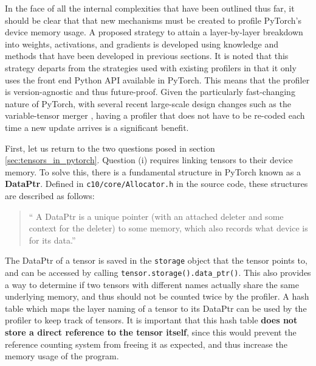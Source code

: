 \documentclass[12pt,letterpaper]{article}
\begin{document}
In the face of all the internal complexities that have been outlined thus far, it should be clear that that new mechanisms must be created to profile PyTorch's device memory usage. A proposed strategy to attain a layer-by-layer breakdown into weights, activations, and gradients is developed using knowledge and methods that have been developed in previous sections. It is noted that this strategy departs from the strategies used with existing profilers in that it only uses the front end Python API available in PyTorch. This means that the profiler is version-agnostic and thus future-proof. Given the particularly fast-changing nature of PyTorch, with several recent large-scale design changes such as the variable-tensor merger \cite{pytorch_variable_tensor_merger}, having a profiler that does not have to be re-coded each time a new update arrives is a significant benefit. 
\par 

First, let us return to the two questions posed in section \ref{sec:tensors_in_pytorch}. Question (i) requires linking tensors to their device memory. To solve this, there is a fundamental structure in PyTorch known as a \textbf{DataPtr}. Defined in \texttt{c10/core/Allocator.h} in the source code, these structures are described as follows:
\begin{quote}
\enquote{
A DataPtr is a unique pointer (with an attached deleter and some context for the deleter) to some memory, which also records what device is for its data.}
\end{quote}
The DataPtr of a tensor is saved in the \texttt{storage} object that the tensor points to, and can be accessed by calling \texttt{tensor.storage().data\_ptr()}. This also provides a way to determine if two tensors with different names actually share the same underlying memory, and thus should not be counted twice by the profiler. A hash table which maps the layer naming of a tensor to its DataPtr can be used by the profiler to keep track of tensors. It is important that this hash table \textbf{does not store a direct reference to the tensor itself}, since this would prevent the reference counting system from freeing it as expected, and thus increase the memory usage of the program. 
\par 
\end{document}
